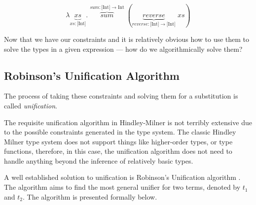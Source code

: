 \documentclass{l4proj}
\begin{document}
\[\lambda \underbrace{xs}_{xs : \text{[Int]}} . \; \overbrace{\mathit{sum}}^{sum : \text{[Int]} \rightarrow \text{Int}} \; (\underbrace{\mathit{reverse}}_{reverse : \text{[Int]} \rightarrow \text{[Int]}} \; xs)\]

Now that we have our constraints and it is relatively obvious how to use them to solve the types in a given expression — how do we algorithmically solve them?

\subsection*{Robinson's Unification Algorithm}

The process of taking these constraints and solving them for a substitution is called \emph{unification}\citep{Robinson_1965}.

The requisite unification algorithm in Hindley-Milner is not terribly extensive due to the possible constraints generated in the type system.
The classic Hindley Milner type system does not support things like higher-order types, or type functions, therefore, in this case, the unification algorithm does not need to handle anything beyond the inference of relatively basic types.

A well established solution to unification is Robinson's Unification algorithm \citep{Robinson_1965}.
The algorithm aims to find the most general unifier for two terms, denoted by $t_1$ and $t_2$.
The algorithm is presented formally below.



\end{document}
